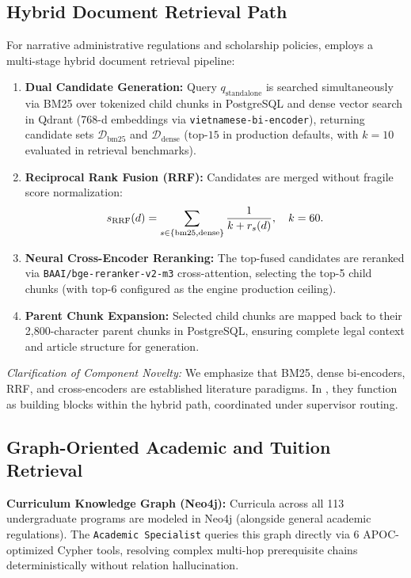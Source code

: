 \subsection{Hybrid Document Retrieval Path}
\label{sec:hybrid_path}

For narrative administrative regulations and scholarship policies, \system{} employs a multi-stage hybrid document retrieval pipeline:
\begin{enumerate}
    \item \textbf{Dual Candidate Generation:} Query $q_{\text{standalone}}$ is searched simultaneously via BM25 over tokenized child chunks in PostgreSQL and dense vector search in Qdrant (768-d embeddings via \texttt{vietnamese-bi-encoder}), returning candidate sets $\mathcal{D}_{\text{bm25}}$ and $\mathcal{D}_{\text{dense}}$ ($\text{top-}15$ in production defaults, with $k=10$ evaluated in retrieval benchmarks).
    \item \textbf{Reciprocal Rank Fusion (RRF):} Candidates are merged without fragile score normalization:
    \begin{equation}
        s_{\mathrm{RRF}}(d) = \sum_{s \in \{\text{bm25}, \text{dense}\}} \frac{1}{k + r_s(d)}, \quad k = 60.
    \end{equation}
    \item \textbf{Neural Cross-Encoder Reranking:} The top-fused candidates are reranked via \texttt{BAAI/bge-reranker-v2-m3} cross-attention, selecting the top-5 child chunks (with $\text{top-}6$ configured as the engine production ceiling).
    \item \textbf{Parent Chunk Expansion:} Selected child chunks are mapped back to their 2,800-character parent chunks in PostgreSQL, ensuring complete legal context and article structure for generation.
\end{enumerate}
\emph{Clarification of Component Novelty:} We emphasize that BM25, dense bi-encoders, RRF, and cross-encoders are established literature paradigms. In \system{}, they function as building blocks within the hybrid path, coordinated under supervisor routing.

\subsection{Graph-Oriented Academic and Tuition Retrieval}
\label{sec:graph_path}

\textbf{Curriculum Knowledge Graph (Neo4j):} Curricula across all 113 undergraduate programs are modeled in Neo4j (alongside general academic regulations). The \texttt{Academic Specialist} queries this graph directly via 6 APOC-optimized Cypher tools, resolving complex multi-hop prerequisite chains deterministically without relation hallucination.

